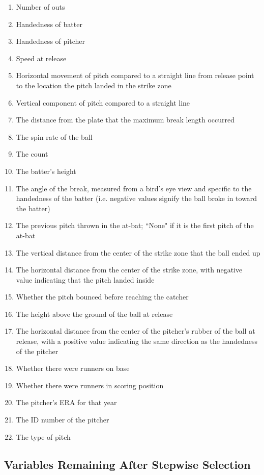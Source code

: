 \documentclass{article}
\begin{document}
\begin{enumerate}
    \item Number of outs
    \item Handedness of batter
    \item Handedness of pitcher
    \item Speed at release
    \item Horizontal movement of pitch compared to a straight line from release point to the location the pitch landed in the strike zone
    \item Vertical component of pitch compared to a straight line
    \item The distance from the plate that the maximum break length occurred
    \item The spin rate of the ball
    \item The count
    \item The batter's height
    \item The angle of the break, measured from a bird's eye view and specific to the handedness of the batter (i.e. negative values signify the ball broke in toward the batter)
    \item The previous pitch thrown in the at-bat; ``None" if it is the first pitch of the at-bat
    \item The vertical distance from the center of the strike zone that the ball ended up
    \item The horizontal distance from the center of the strike zone, with negative value indicating that the pitch landed inside
    \item Whether the pitch bounced before reaching the catcher
    \item The height above the ground of the ball at release
    \item The horizontal distance from the center of the pitcher's rubber of the ball at release, with a positive value indicating the same direction as the handedness of the pitcher
    \item Whether there were runners on base
    \item Whether there were runners in scoring position
    \item The pitcher's ERA for that year
    \item The ID number of the pitcher
    \item The type of pitch
\end{enumerate}

\subsection{Variables Remaining After Stepwise Selection}
\end{document}
